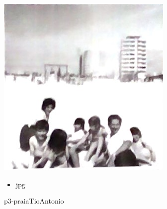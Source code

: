 \documentclass{article}
\begin{document}
		\begin{figure}[ht!]
		\begin{minipage}{0.35\textwidth}
			\centering
			\includegraphics[width=\linewidth]{ManuelVilar/ClaraVilar/p3-praiaTioAntonio.jpg}
			\caption{ p3-praiaTioAntonio }
		\end{minipage}
		\hspace{1cm} %
		\begin{minipage}{0.3\textwidth}
			\begin{tcolorbox}[colback=white, colframe=black, boxrule=1pt]
				\begin{itemize}
					\item jpg
                    
				\end{itemize}

			\end{tcolorbox}
		\end{minipage}
	\end{figure}
	
\end{document}
